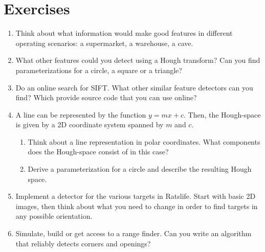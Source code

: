 
\section*{Exercises}\small
\begin{enumerate}
\item Think about what information would make good features in different operating scenarios: a supermarket, a warehouse, a cave.
\item What other features could you detect using a Hough transform? Can you find parameterizations for a circle, a square or a triangle?
\item Do an online search for SIFT. What other similar feature detectors can you find? Which provide source code that you can use online?
\item A line can be represented by the function $y=mx+c$. Then, the Hough-space is given by a 2D coordinate system spanned by $m$ and $c$.\begin{enumerate}
\item Think about a line representation in polar coordinates. What components does the Hough-space consist of in this case?
\item Derive a parameterization for a circle and describe the resulting Hough space.
\end{enumerate}
\item Implement a detector for the various targets in Ratslife. Start with basic 2D images, then think about what you need to change in order to find targets in any possible orientation.
\item Simulate, build or get access to a range finder. Can you write an algorithm that reliably detects corners and openings?
\end{enumerate}
\normalsize
